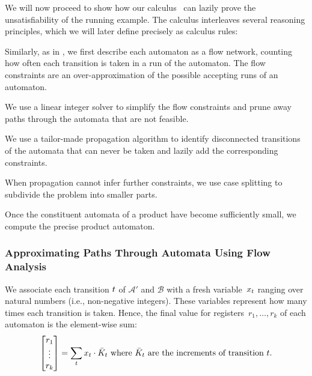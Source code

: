 We will now proceed to show how our calculus~\Calculus{} can lazily
prove the unsatisfiability of the running example. The calculus
interleaves several reasoning principles, which we will later
define precisely as calculus rules:
\begin{inparaenum}[(i)]
\item Similarly, as in \cite{generate-parikh-image}, we first describe
  each automaton as a flow network, counting how often each transition
  is taken in a run of the automaton. The flow constraints are an
  over-approximation of the possible accepting runs of an automaton.
\item We use a linear integer solver to simplify the flow constraints
  and prune away paths through the automata that are not feasible.
\item We use a tailor-made propagation algorithm to identify disconnected
  transitions of the automata that can never be taken and lazily add
  the corresponding constraints.
\item When propagation cannot infer further constraints, we use case
  splitting to subdivide the problem into smaller parts.
\item Once the constituent automata of a product have become
  sufficiently small, we compute the precise product automaton.
\end{inparaenum}

\subsubsection{Approximating Paths Through Automata Using Flow Analysis}\label{sec:a_1}

We associate each transition $t$ of $\mathcal{A}'$ and $\mathcal{B}$ with a fresh
variable~$x_t$ ranging over natural numbers (i.e.,
non-negative integers).
These variables represent how many times each
transition is taken. Hence, the final value for registers~$r_1, \ldots,
r_k$ of each automaton is the element-wise sum:
\begin{equation}\label{eq:counter-sums}
\begin{bmatrix} 
  r_1 \\
  \vdots\\
  r_k \\
\end{bmatrix} = \sum_t x_t \cdot 
  \bar{K}_t \text{ where $\bar{K}_t$ are the increments of transition $t$}.
\end{equation}

